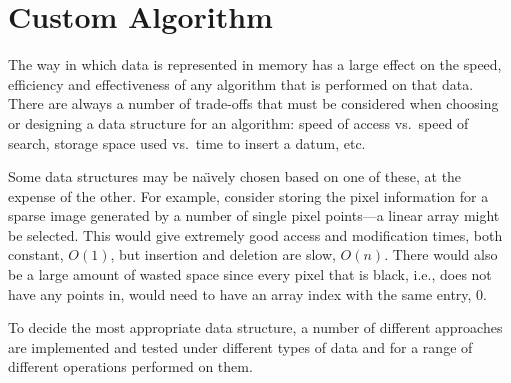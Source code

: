 
\chapter{Custom Algorithm}
\label{prt:custom_algorithm}

The way in which data is represented in memory has a large effect on the speed,
efficiency and effectiveness of any algorithm that is performed on that data.
There are always a number of trade-offs that must be considered when choosing
or designing a data structure for an algorithm: speed of access vs.\ speed of
search, storage space used vs.\ time to insert a datum, etc.

Some data structures may be na\"{\i}vely chosen based on one of these, at the
expense of the other. For example, consider storing the pixel information for a
sparse image generated by a number of single pixel points---a linear array
might be selected. This would give extremely good access and modification
times, both constant, $O(1)$, but insertion and deletion are slow, $O(n)$.
There would also be a large amount of wasted space since every pixel that is
black, i.e., does not have any points in, would need to have an array index
with the same entry, $0$.

To decide the most appropriate data structure, a number of different approaches
are implemented and tested under different types of data and for a range of
different operations performed on them.
